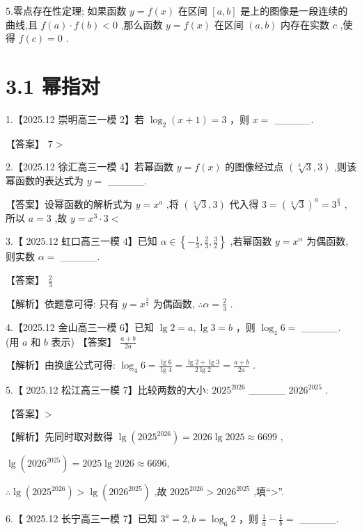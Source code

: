 \documentclass[10pt]{article}
\begin{document}
5.零点存在性定理; 如果函数 \(y = f\left( x\right)\) 在区间 \(\left\lbrack  {a,b}\right\rbrack\) 是上的图像是一段连续的曲线,且 \(f\left( a\right)  \cdot  f\left( b\right)  < 0\) ,那么函数 \(y = f\left( x\right)\) 在区间 \(\left( {a,b}\right)\) 内存在实数 \(c\) ,使得 \(f\left( c\right)  = 0\) .

\section*{3.1 幂指对}

1.【2025.12 崇明高三一模 2】若 \({\log }_{2}\left( {x + 1}\right)  = 3\) ，则 \(x =\) \_\_\_\_\_.

【答案】 \(7 >\)

2.【2025.12 徐汇高三一模 4】若幂函数 \(y = f\left( x\right)\) 的图像经过点 \(\left( {\sqrt[3]{3},3}\right)\) ,则该幂函数的表达式为 \(y =\) \_\_\_\_\_.

【答案】设幂函数的解析式为 \(y = {x}^{a}\) ,将 \(\left( {\sqrt[3]{3},3}\right)\) 代入得 \(3 = {\left( \sqrt[3]{3}\right) }^{a} = {3}^{\frac{a}{3}}\) ,所以 \(a = 3\) ,故 \(y = {x}^{3} \cdot  3 <\)

3.【 2025.12 虹口高三一模 4】已知 \(\alpha  \in  \left\{  {-\frac{1}{3},\frac{2}{3},\frac{3}{2}}\right\}\) ,若幂函数 \(y = {x}^{\alpha }\) 为偶函数,则实数 \(\alpha  =\) \_\_\_\_\_.

【答案】 \(\frac{2}{3}\)

【解析】依题意可得: 只有 \(y = {x}^{\frac{2}{3}}\) 为偶函数, \(\therefore \alpha  = \frac{2}{3}\) .

4.【2025.12 金山高三一模 6】已知 \(\lg 2 = a,\lg 3 = b\) ，则 \({\log }_{4}6 =\) \_\_\_\_\_. (用 \(a\) 和 \(b\) 表示) 【答案】 \(\frac{a + b}{2a}\)

【解析】由换底公式可得: \({\log }_{4}6 = \frac{\lg 6}{\lg 4} = \frac{\lg 2 + \lg 3}{2\lg 2} = \frac{a + b}{2a}\) .

5.【 2025.12 松江高三一模 7】比较两数的大小: \({2025}^{2026}\) \_\_\_\_\_ \({2026}^{2025}\) .

【答案】>

【解析】先同时取对数得 \(\lg \left( {2025}^{2026}\right)  = {2026}\lg {2025} \approx  {6699}\) ,

\(\lg \left( {2026}^{2025}\right)  = {2025}\lg {2026} \approx  {6696},\)

\(\therefore \lg \left( {2025}^{2026}\right)  > \lg \left( {2026}^{2025}\right)\) ,故 \({2025}^{2026} > {2026}^{2025}\) ,填“>”.

6.【 2025.12 长宁高三一模 7】已知 \({3}^{a} = 2,b = {\log }_{6}2\) ，则 \(\frac{1}{a} - \frac{1}{b} =\) \_\_\_\_\_.
\end{document}
